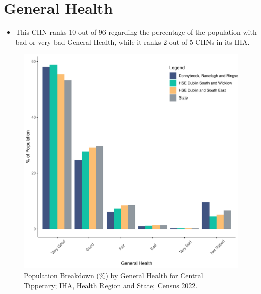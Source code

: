 \documentclass{article}
\begin{document}
\pagebreak

\section{General Health}\label{sect:GenHealth}
\begin{itemize}
\item  This CHN ranks  10 out of 96 regarding the percentage of the population with bad or very bad General Health, while it ranks   2 out of 5 CHNs in its IHA.
\end{itemize}
\begin{figure}[h]
	\centering
	\includegraphics[width = 150mm]{../figures/GenED.pdf}
	\caption{Population Breakdown (\%) by General Health for Central Tipperary; IHA, Health Region and State;  Census 2022.}
	\label{fig:2ae19629-1a6a-13a3-e055-000000000001}
	\end{figure}
\end{document}

